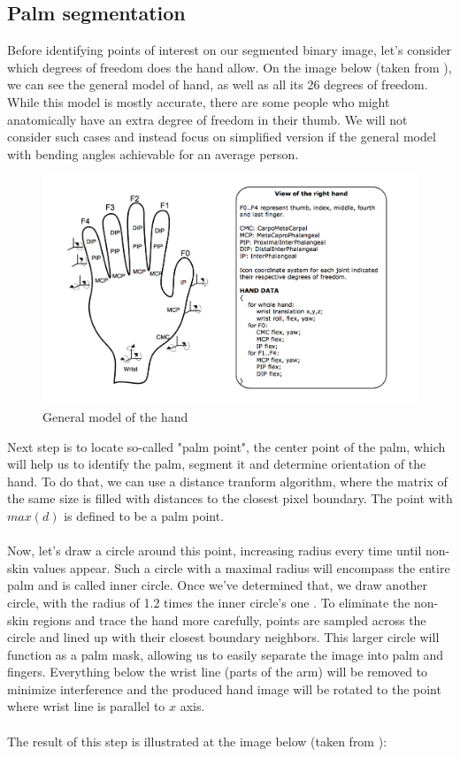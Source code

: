 \documentclass[a4paper,11pt,oneside]{article}
\begin{document}
  \subsection{Palm segmentation}
  
  Before identifying points of interest on our segmented binary image, let's consider which degrees of freedom does the hand allow. On the image below (taken from \cite{OT01}), we can see the general model of hand, as well as all its 26 degrees of freedom. While this model is mostly accurate, there are some people who might anatomically have an extra degree of freedom in their thumb. We will not consider such cases and instead focus on simplified version if the general model with bending angles achievable for an average person.\\
  
  \begin{figure}[H]
  \centering
  \includegraphics[scale=0.47]{hand-dof.png}
  \caption{General model of the hand}
  \end{figure}
  
  Next step is to locate so-called "palm point", the center point of the palm, which will help us to identify the palm, segment it and determine orientation of the hand. To do that, we can use a distance tranform algorithm, where the matrix of the same size is filled with distances to the closest pixel boundary. The point with $max(d)$ is defined to be a palm point.\\
  \\
  Now, let's draw a circle around this point, increasing radius every time until non-skin values appear. Such a circle with a maximal radius will encompass the entire palm and is called inner circle. Once we've determined that, we draw another circle, with the radius of 1.2 times the inner circle's one \cite{ZH01}. To eliminate the non-skin regions and trace the hand more carefully, points are sampled across the circle and lined up with their closest boundary neighbors. This larger circle will function as a palm mask, allowing us to easily separate the image into palm and fingers. Everything below the wrist line (parts of the arm) will be removed to minimize interference and the produced hand image will be rotated to the point where wrist line is parallel to $x$ axis.\\
  \\
  The result of this step is illustrated at the image below (taken from \cite{ZH01}):\\
  
\end{document}
